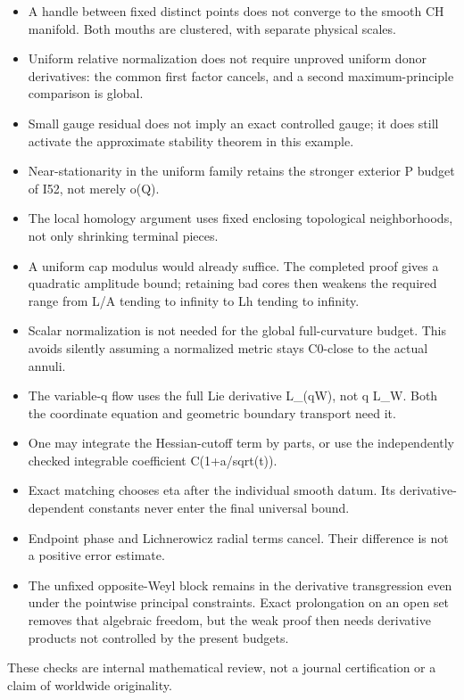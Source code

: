 \documentclass[
  10pt,
]{article}
\providecommand{\tightlist}{%
  \setlength{\itemsep}{0pt}\setlength{\parskip}{0pt}}
\begin{document}
\begin{itemize}
\tightlist
\item
  A handle between fixed distinct points does not converge to the smooth
  CH manifold. Both mouths are clustered, with separate physical scales.
\item
  Uniform relative normalization does not require unproved uniform donor
  derivatives: the common first factor cancels, and a second
  maximum-principle comparison is global.
\item
  Small gauge residual does not imply an exact controlled gauge; it does
  still activate the approximate stability theorem in this example.
\item
  Near-stationarity in the uniform family retains the stronger exterior
  P budget of I52, not merely o(Q).
\item
  The local homology argument uses fixed enclosing topological
  neighborhoods, not only shrinking terminal pieces.
\item
  A uniform cap modulus would already suffice. The completed proof gives
  a quadratic amplitude bound; retaining bad cores then weakens the
  required range from L/A tending to infinity to Lh tending to infinity.
\item
  Scalar normalization is not needed for the global full-curvature
  budget. This avoids silently assuming a normalized metric stays
  C0-close to the actual annuli.
\item
  The variable-q flow uses the full Lie derivative L\_(qW), not q L\_W.
  Both the coordinate equation and geometric boundary transport need it.
\item
  One may integrate the Hessian-cutoff term by parts, or use the
  independently checked integrable coefficient C(1+a/sqrt(t)).
\item
  Exact matching chooses eta after the individual smooth datum. Its
  derivative-dependent constants never enter the final universal bound.
\item
  Endpoint phase and Lichnerowicz radial terms cancel. Their difference
  is not a positive error estimate.
\item
  The unfixed opposite-Weyl block remains in the derivative
  transgression even under the pointwise principal constraints. Exact
  prolongation on an open set removes that algebraic freedom, but the
  weak proof then needs derivative products not controlled by the
  present budgets.
\end{itemize}

These checks are internal mathematical review, not a journal
certification or a claim of worldwide originality.
\end{document}
